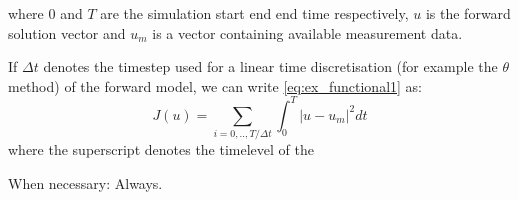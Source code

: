 where $0$ and $T$ are the simulation start end end time respectively, $u$ is the forward solution vector and $u_m$ is a vector containing available measurement data.


If $\Delta t$ denotes the timestep used for a linear time discretisation (for example the $\theta$ method) of the forward model, we can write \autoref{eq:ex_functional1} as:
\begin{equation}
J(u) = \sum_{i=0,..,T/\Delta t} \int_0^T |u - u_{m}|^2 dt
\label{eq:ex_functional1}
\end{equation}
where the superscript denotes the timelevel of the



When necessary: Always.


